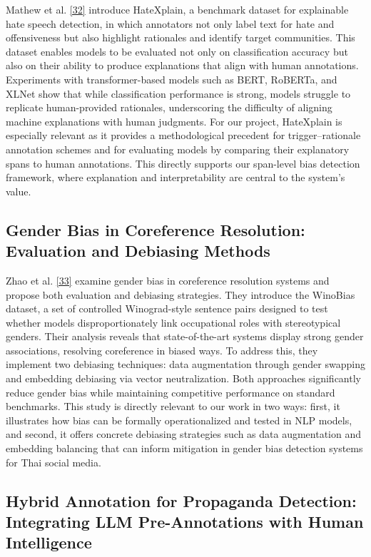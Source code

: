 \documentclass[12pt,oneside,openright,a4paper]{cpe-english-project}
\begin{document}
Mathew et al. \hyperlink{bib:ref32}{[32]} introduce HateXplain, a benchmark dataset for explainable hate speech detection, in which annotators not only label text for hate and offensiveness but also highlight rationales and identify target communities. This dataset enables models to be evaluated not only on classification accuracy but also on their ability to produce explanations that align with human annotations. Experiments with transformer-based models such as BERT, RoBERTa, and XLNet show that while classification performance is strong, models struggle to replicate human-provided rationales, underscoring the difficulty of aligning machine explanations with human judgments. For our project, HateXplain is especially relevant as it provides a methodological precedent for trigger--rationale annotation schemes and for evaluating models by comparing their explanatory spans to human annotations. This directly supports our span-level bias detection framework, where explanation and interpretability are central to the system's value.

\subsection{Gender Bias in Coreference Resolution: Evaluation and Debiasing Methods}

Zhao et al. \hyperlink{bib:ref33}{[33]} examine gender bias in coreference resolution systems and propose both evaluation and debiasing strategies. They introduce the WinoBias dataset, a set of controlled Winograd-style sentence pairs designed to test whether models disproportionately link occupational roles with stereotypical genders. Their analysis reveals that state-of-the-art systems display strong gender associations, resolving coreference in biased ways. To address this, they implement two debiasing techniques: data augmentation through gender swapping and embedding debiasing via vector neutralization. Both approaches significantly reduce gender bias while maintaining competitive performance on standard benchmarks. This study is directly relevant to our work in two ways: first, it illustrates how bias can be formally operationalized and tested in NLP models, and second, it offers concrete debiasing strategies such as data augmentation and embedding balancing that can inform mitigation in gender bias detection systems for Thai social media.

\subsection{Hybrid Annotation for Propaganda Detection: Integrating LLM Pre-Annotations with Human Intelligence}
\end{document}
